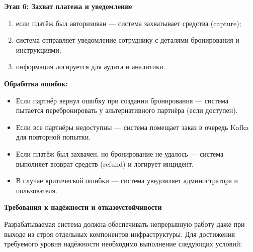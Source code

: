 \documentclass{bmstu}
\begin{document}
\textbf{Этап 6: Захват платежа и уведомление}

\begin{enumerate}
    \item если платёж был авторизован — система захватывает средства (capture);
    \item система отправляет уведомление сотруднику с деталями бронирования и инструкциями;
    \item информация логируется для аудита и аналитики.
\end{enumerate}

\textbf{Обработка ошибок:}

\begin{itemize}
    \item Если партнёр вернул ошибку при создании бронирования — система пытается перебронировать у альтернативного партнёра (если доступен).
    \item Если все партнёры недоступны — система помещает заказ в очередь Kafka для повторной попытки.
    \item Если платёж был захвачен, но бронирование не удалось — система выполняет возврат средств (refund) и логирует инцидент.
    \item В случае критической ошибки — система уведомляет администратора и пользователя.
\end{itemize}

\begin{center}
    \textbf{Требования к надёжности и отказоустойчивости}
\end{center}

Разрабатываемая система должна обеспечивать непрерывную работу даже при выходе из строя отдельных компонентов инфраструктуры. Для достижения требуемого уровня надёжности необходимо выполнение следующих условий:
\end{document}
